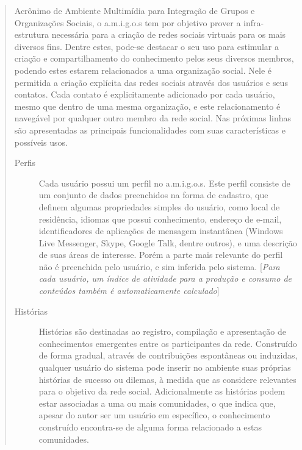 \begin{quote}{\citep{RicardoAraujoCosta2008}}
	Acrônimo de Ambiente Multimídia para Integração de Grupos e Organizações Sociais,
	o a.m.i.g.o.s tem por objetivo prover a infra-estrutura necessária para a criação
	de redes sociais virtuais para os mais diversos fins. Dentre estes, pode-se
	destacar o seu uso para estimular a criação e compartilhamento do conhecimento
	pelos seus diversos membros, podendo estes estarem relacionados a uma organização
	social. Nele é permitida a criação explícita das redes sociais através dos
	usuários e seus contatos. Cada contato é explicitamente adicionado por cada
	usuário, mesmo que dentro de uma mesma organização, e este relacionamento é
	navegável por qualquer outro membro da rede social. Nas próximas linhas são
	apresentadas as principais funcionalidades com suas características e possíveis
	usos.
	\begin{description}
	\item[Perfis] Cada usuário possui um perfil no a.m.i.g.o.s. Este perfil
	consiste de um conjunto de dados preenchidos na forma de cadastro, que definem
	algumas propriedades simples do usuário, como local de residência, idiomas que
	possui conhecimento, endereço de e-mail, identificadores de aplicações de
	mensagem instantânea (Windows Live Messenger, Skype, Google Talk, dentre
	outros), e uma descrição de suas áreas de interesse. Porém a parte mais
	relevante do perfil não é preenchida pelo usuário, e sim inferida pelo
	sistema. [\emph{Para cada usuário, um índice de atividade para a produção e
	consumo de conteúdos também é automaticamente calculado}]
	\item[Histórias] Histórias são destinadas ao registro, compilação e
	apresentação de conhecimentos emergentes entre os participantes da rede.
	Construído de forma gradual, através de contribuições espontâneas ou
	induzidas, qualquer usuário do sistema pode inserir no ambiente suas próprias
	histórias de sucesso ou dilemas, à medida que as considere relevantes para o
	objetivo da rede social. Adicionalmente as histórias podem estar associadas a
	uma ou mais comunidades, o que indica que, apesar do autor ser um usuário em
	específico, o conhecimento construído encontra-se de alguma forma relacionado
	a estas comunidades.


\end{description}
\end{quote}
